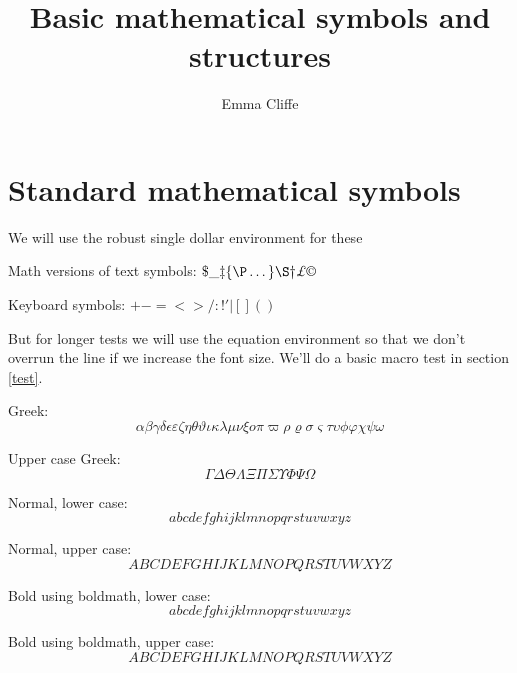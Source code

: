 \documentclass[12pt,a4paper,onecolumn]{article}
\title{Basic mathematical symbols and structures}
\author{Emma Cliffe}
\date{}
\begin{document}
\maketitle
\tableofcontents
\newpage
\section{Standard mathematical symbols}

We will use the robust single dollar environment for these

Math versions of text symbols: $\$  \_  \ddag  \{  \P  \dots  \}  \S  \dag  \pounds \copyright$

Keyboard symbols: $+  -  =  <  >  /  :  !  '  |  [  ]  (  )$

\noindent 
But for longer tests we will use the equation environment so that we don't overrun the line if we increase the font size. We'll do a basic macro test in section \ref{test}.

Greek:
\begin{equation}
\alpha  \beta  \gamma  \delta  \epsilon  \varepsilon  \zeta  \eta  \theta  \vartheta  \iota  \kappa  \lambda  \mu  \nu  \xi  o  \pi  \varpi  \rho  \varrho  \sigma  \varsigma  \tau  \upsilon  \phi  \varphi  \chi  \psi  \omega
\end{equation}

Upper case Greek:
\begin{equation}
\Gamma  \Delta  \Theta  \Lambda  \Xi  \Pi  \Sigma  \Upsilon  \Phi  \Psi  \Omega
\end{equation}

Normal, lower case:
\begin{equation}
a  b  c  d  e  f  g  h  i  j  k  l  m  n  o  p  q  r  s  t  u  v  w  x  y  z
\end{equation}

Normal, upper case:
\begin{equation}
A  B  C  D  E  F  G  H  I  J  K  L  M  N  O  P  Q  R  S  T  U  V  W  X  Y  Z  
\end{equation}

Bold using boldmath, lower case:\boldmath
\begin{equation}
a  b  c  d  e  f  g  h  i  j  k  l  m  n  o  p  q  r  s  t  u  v  w  x  y  z
\end{equation}\unboldmath

Bold using boldmath, upper case:\boldmath
\begin{equation}
A  B  C  D  E  F  G  H  I  J  K  L  M  N  O  P  Q  R  S  T  U  V  W  X  Y  Z  
\end{equation}\unboldmath
\end{document}
